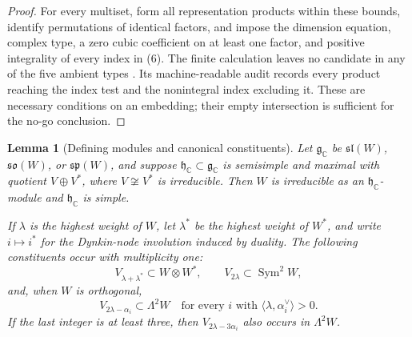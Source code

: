 \documentclass[11pt]{article}
\newtheorem{lemma}[theorem]{Lemma}
\theoremstyle{remark}
\newcommand{\g}{\mathfrak g}
\newcommand{\h}{\mathfrak h}
\begin{document}
\begin{proof}
For every multiset, form all representation products within these bounds,
identify permutations of identical factors, and impose the dimension
equation, complex type, a zero cubic coefficient on at least one factor,
and positive integrality of every index in \textup{(6)}. The finite
calculation leaves no candidate in any of the five ambient types
\cite{ComputationalCompanion}. Its machine-readable audit records every
product reaching the index test and the nonintegral index excluding it.
These are necessary conditions on an embedding; their empty intersection
is sufficient for the no-go conclusion.
\end{proof}

\begin{lemma}[Defining modules and canonical constituents]
\label{lem:classical-constituents}
Let \(\g_{\mathbb C}\) be \(\mathfrak{sl}(W)\),
\(\mathfrak{so}(W)\), or \(\mathfrak{sp}(W)\), and suppose
\(\h_{\mathbb C}\subset\g_{\mathbb C}\) is semisimple and maximal with
quotient \(V\oplus V^*\), where \(V\not\cong V^*\) is irreducible.  Then
\(W\) is irreducible as an \(\h_{\mathbb C}\)-module and
\(\h_{\mathbb C}\) is simple.

If \(\lambda\) is the highest weight of \(W\), let \(\lambda^*\) be the
highest weight of \(W^*\), and write \(i\mapsto i^*\) for the Dynkin-node
involution induced by duality.  The following constituents occur with
multiplicity one:
\[
 V_{\lambda+\lambda^*}\subset W\otimes W^*,\qquad
 V_{2\lambda}\subset\operatorname{Sym}^2W,
\]
and, when \(W\) is orthogonal,
\[
 V_{2\lambda-\alpha_i}\subset\Lambda^2W
 \quad\text{for every }i\text{ with }
 \langle\lambda,\alpha_i^\vee\rangle>0. \tag{6c}
\]
If the last integer is at least three, then
\(V_{2\lambda-3\alpha_i}\) also occurs in \(\Lambda^2W\).
\end{lemma}
\end{document}
